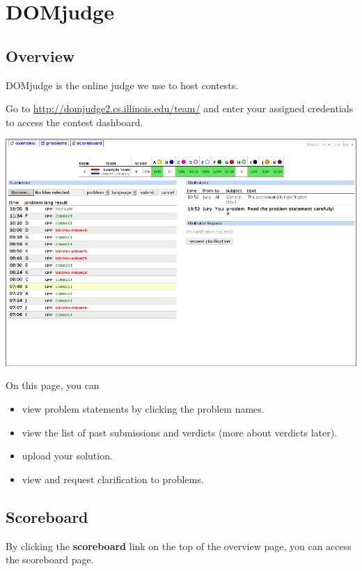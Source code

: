 \documentclass {article}
\begin{document}
\tableofcontents

\newpage
\section{DOMjudge}
\subsection{Overview}
DOMjudge is the online judge we use to host contests.

Go to \url{http://domjudge2.cs.illinois.edu/team/} and enter your assigned 
credentials to access the contest dashboard.

\begin{center}
    \includegraphics[scale=0.3]{dashboard.png}
\end{center}

On this page, you can
\begin{itemize}
\item view problem statements by clicking the problem names.
\item view the list of past submissions and verdicts (more about verdicts
      later).
\item upload your solution.
\item view and request clarification to problems.
\end{itemize}

\subsection{Scoreboard}
By clicking the \textbf{scoreboard} link on the top of the overview page, you
can access the scoreboard page. 
\end{document}
